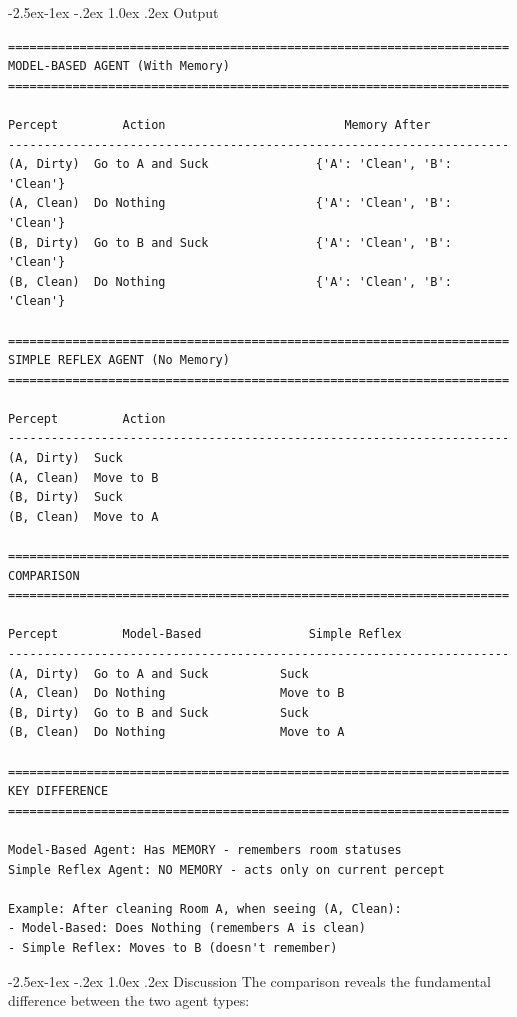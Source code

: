 \documentclass[12pt,a4paper]{article}
\makeatletter
\renewcommand{\subsection}{\@startsection{subsection}{2}{\z@}%
  {-2.5ex\@plus -1ex \@minus -.2ex}%
  {1.0ex \@plus .2ex}%
  {\normalfont\large\bfseries\color{accentblue}}}
\makeatother
\begin{document}
\subsection{Output}
\begin{lstlisting}[style=output, caption={Comparison output}]
======================================================================
MODEL-BASED AGENT (With Memory)
======================================================================

Percept         Action                         Memory After
----------------------------------------------------------------------
(A, Dirty)  Go to A and Suck               {'A': 'Clean', 'B': 'Clean'}
(A, Clean)  Do Nothing                     {'A': 'Clean', 'B': 'Clean'}
(B, Dirty)  Go to B and Suck               {'A': 'Clean', 'B': 'Clean'}
(B, Clean)  Do Nothing                     {'A': 'Clean', 'B': 'Clean'}

======================================================================
SIMPLE REFLEX AGENT (No Memory)
======================================================================

Percept         Action
----------------------------------------------------------------------
(A, Dirty)  Suck
(A, Clean)  Move to B
(B, Dirty)  Suck
(B, Clean)  Move to A

======================================================================
COMPARISON
======================================================================

Percept         Model-Based               Simple Reflex
----------------------------------------------------------------------
(A, Dirty)  Go to A and Suck          Suck
(A, Clean)  Do Nothing                Move to B
(B, Dirty)  Go to B and Suck          Suck
(B, Clean)  Do Nothing                Move to A

======================================================================
KEY DIFFERENCE
======================================================================

Model-Based Agent: Has MEMORY - remembers room statuses
Simple Reflex Agent: NO MEMORY - acts only on current percept

Example: After cleaning Room A, when seeing (A, Clean):
- Model-Based: Does Nothing (remembers A is clean)
- Simple Reflex: Moves to B (doesn't remember)
\end{lstlisting}

\subsection{Discussion}
The comparison reveals the fundamental difference between the two agent types:
\end{document}
